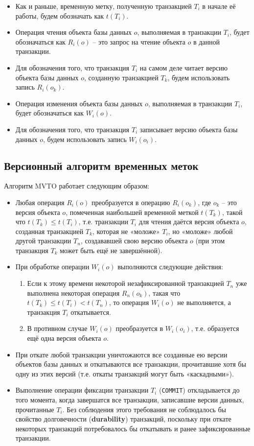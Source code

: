 \documentclass[a4paper,12pt]{article}
\begin{document}
\begin{itemize}
    \item Как и раньше, временную метку, полученную транзакцией $T_i$ в начале её работы, будем обозначать как $t(T_i)$.
    \item Операция чтения объекта базы данных $o$, выполняемая в транзакции $T_i$, будет обозначаться как $R_i(o)$ – это запрос на чтение объекта $o$ в данной транзакции.
    \item Для обозначения того, что транзакция $T_i$ на самом деле читает версию объекта базы данных $o$, созданную транзакцией $T_k$, будем использовать запись $R_i(o_k)$.
    \item Операция изменения объекта базы данных $o$, выполняемая в транзакции $T_i$, будет обозначаться как $W_i(o)$.
    \item Для обозначения того, что транзакция $T_i$ записывает версию объекта базы данных $o$, будем использовать запись $W_i(o_i)$.
\end{itemize}

\subsection{Версионный алгоритм временных меток}

Алгоритм MVTO работает следующим образом:
\begin{itemize}
    \item Любая операция $R_i(o)$ преобразуется в операцию $R_i(o_k)$, где $o_k$ – это версия объекта $o$, помеченная наибольшей временной меткой $t(T_k)$, такой что $t(T_k) \leq t(T_i)$, т.е. транзакции $T_i$ для чтения даётся версия объекта $o$, созданная транзакцией $T_k$, которая не «моложе» $T_i$, но «моложе» любой другой транзакции $T_n$, создававшей свою версию объекта $o$ (при этом транзакция $T_k$ может быть ещё не завершённой).
    \item При обработке операции $W_i(o)$ выполняются следующие действия:
    \begin{enumerate}
        \item Если к этому времени некоторой незафиксированной транзакцией $T_n$ уже выполнена некоторая операция $R_n(o_k)$, такая что $t(T_k) \leq t(T_i) < t(T_n)$, то операция $W_i(o)$ не выполняется, а транзакция $T_i$ откатывается.
        \item В противном случае $W_i(o)$ преобразуется в $W_i(o_i)$, т.е. образуется ещё одна версия объекта $o$.
    \end{enumerate}
    \item При откате любой транзакции уничтожаются все созданные ею версии объектов базы данных и откатываются все транзакции, прочитавшие хотя бы одну из этих версий (т.е. откаты транзакций могут быть «каскадными»).
    \item Выполнение операции фиксации транзакции $T_i$ (\texttt{COMMIT}) откладывается до того момента, когда завершатся все транзакции, записавшие версии данных, прочитанные $T_i$. Без соблюдения этого требования не соблюдалось бы свойство долговечности (\textbf{durability}) транзакций, поскольку при откате некоторых транзакций потребовалось бы откатывать и ранее зафиксированные транзакции.
\end{itemize}
\end{document}
